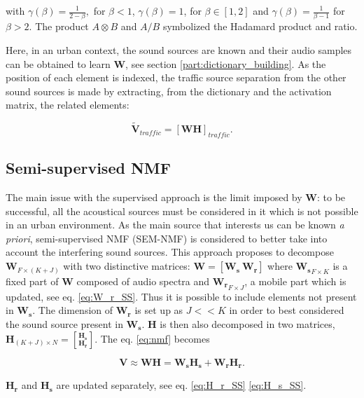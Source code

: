 \documentclass[review,5p,twocolumn,sort&compress,times]{elsarticle}
\begin{document}
with $\gamma(\beta) = \frac{1}{2-\beta},$ for $\beta < 1$, $ \gamma(\beta) = 1$, for $\beta \in \left[1,2\right]$ and $\gamma(\beta) = \frac{1}{\beta-1}$ for $\beta > 2$. The product $A\otimes B$ and $A/B$ symbolized the Hadamard product and ratio.  

Here, in an urban context, the sound sources are known and their audio samples can be obtained to learn $\mathbf{W}$, see section \ref{part:dictionary_building}. As the position of each element is indexed, the traffic source separation from the other sound sources is made by extracting, from the dictionary and the activation matrix, the related elements: 

\begin{equation}\label{eq:separationExtraction}
\mathbf{\tilde{V}}_{traffic} = \left[ \mathbf{WH} \right]_{traffic}.
\end{equation}

\subsection{Semi-supervised NMF}
The main issue with the supervised approach is the limit imposed by $\mathbf{W}$: to be successful, all the acoustical sources must be considered in it which is not possible in an urban environment. As the main source that interests us can be known \textit{a priori}, semi-supervised NMF (SEM-NMF) \cite{lee_semi-supervised_2010} is considered to better take into account the interfering sound sources. This approach proposes to decompose $\mathbf{W}_{F \times (K+J)}$ with two distinctive matrices: $\mathbf{W} = \left[ \mathbf{W_s}~\mathbf{W_r} \right]$ where $\mathbf{W_s}_{F \times K}$ is a fixed part of $\mathbf{W}$ composed of audio spectra and $ \mathbf{W_r}_{F \times J}$, a mobile part which is updated, see eq. \ref{eq:W_r_SS}. Thus it is possible to include elements not present in $\mathbf{W_s}$. The dimension of $\mathbf{W_r}$ is set up as $J << K$ in order to best considered the sound source present in $\mathbf{W_s}$. $\mathbf{H}$ is then also decomposed in two matrices, $\mathbf{H}_{(K+J) \times N} = \genfrac[]{0pt}{0}{\mathbf{H_s}}{\mathbf{H_r}}$. The eq. \ref{eq:nmf} becomes 

\begin{equation}
\mathbf{V} \approx \mathbf{WH} = \mathbf{W_s H_s}+\mathbf{W_r H_r}.
\end{equation} 

$\mathbf{H_r}$ and $\mathbf{H_s}$ are updated separately, see eq. \ref{eq:H_r_SS} \ref{eq:H_s_SS}. 
\end{document}
